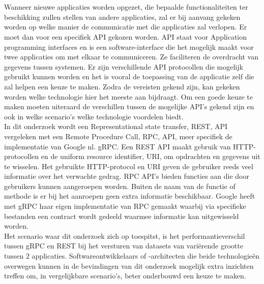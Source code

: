 
\chapter{}%
\label{ch:inleiding}

Wanneer nieuwe applicaties worden opgezet, die bepaalde functionaliteiten ter beschikking zullen stellen van andere applicaties, zal er bij aanvang gekeken worden
op welke manier de communicatie met die applicaties zal verlopen. Er moet dan voor een specifiek API gekozen worden.
API staat voor Application programming interfaces en is een software-interface die het mogelijk maakt voor twee
applicaties om met elkaar te communiceren. Ze faciliteren de overdracht van gegevens tussen systemen. Er zijn verschillende API protocollen die mogelijk gebruikt kunnen worden
en het is vooral de toepassing van de applicatie zelf die zal helpen een keuze te maken. Zodra de vereisten gekend zijn, kan gekeken worden welke technologie hier
het meeste aan bijdraagt. Om een goede keuze te maken moeten uiteraard de verschillen tussen de mogelijke API's gekend zijn en ook in welke scenario's welke technologie voordelen biedt.\\

In dit onderzoek wordt een Representational state transfer, REST, API vergeleken met een Remote Procedure Call, RPC, API, meer specifiek de
implementatie van Google nl. gRPC. Een REST API maakt gebruik van HTTP-protocollen en de uniform resource identifier, URI, om opdrachten en gegevens uit te wisselen.
Het gebruikte HTTP-protocol en URI geven de gebruiker reeds veel informatie over het verwachte gedrag.
RPC API's bieden functies aan die door gebruikers kunnen aangeroepen worden.
Buiten de naam van de functie of methode is er bij het aanroepen geen extra informatie beschikbaar.
Google heeft met gRPC haar eigen implementatie van RPC gemaakt waarbij via specifieke bestanden een contract wordt gedeeld waarmee informatie kan uitgewisseld worden.\\

Het scenario waar dit onderzoek zich op toespitst, is het performantieverschil tussen gRPC en REST bij het versturen van datasets van variërende grootte tussen 2 applicaties.
Softwareontwikkelaars of -architecten die beide technologie\"en overwegen kunnen in de bevindingen van dit onderzoek mogelijk extra inzichten treffen
om, in vergelijkbare scenario's, beter onderbouwd een keuze te maken.\\

